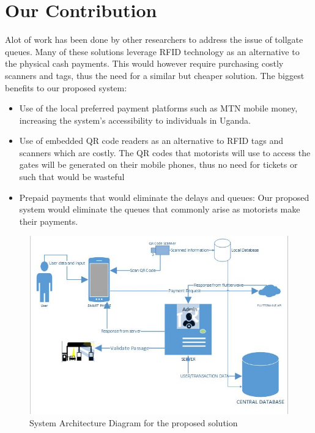 \section{Our Contribution}
Alot of work has been done by other researchers to address the issue of tollgate queues. Many of these solutions leverage RFID technology as an alternative to the physical cash payments. This would however require purchasing costly scanners and tags, thus the need for a similar but cheaper solution.
The biggest benefits to our proposed system:
\begin{itemize}
    \item Use of the local preferred payment platforms such as MTN mobile money, increasing the system's accessibility to individuals in Uganda.
    \item Use of embedded QR code readers as an alternative to RFID tags and scanners which are costly. The QR codes that motorists will use to access the gates will be generated on their mobile phones, thus no need for tickets or such that would be wasteful
    \item Prepaid payments that would eliminate the delays and queues: Our proposed system would eliminate the queues that commonly arise as motorists make their payments.
\end{itemize}

\begin{figure}
    \begin{center}
        \includegraphics[scale = 0.6]{images/etolssys}
        \caption{System Architecture Diagram for the proposed solution }
    \end{center}
\end{figure}